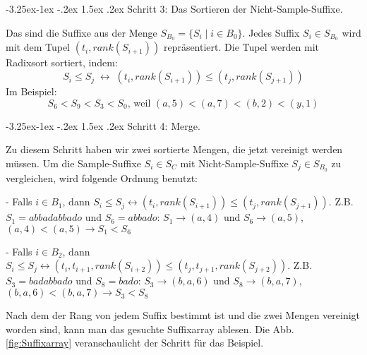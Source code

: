 \documentclass[12pt]{report}
\makeatletter
\renewcommand\paragraph{\@startsection{paragraph}{4}{\z@}%
    {-3.25ex\@plus -1ex \@minus -.2ex}%
    {1.5ex \@plus .2ex}%
    {\normalfont\normalsize\bfseries}}
\makeatother
\begin{document}
\paragraph{Schritt 3: Das Sortieren der Nicht-Sample-Suffixe.}

Das sind die Suffixe aus der Menge $S_{B_0} = \{S_i \mid i \in B_0\}$. Jedes Suffix $S_i \in S_{B_0}$ wird mit dem Tupel $(t_i,rank(S_{i+1}))$ repräsentiert. Die Tupel werden mit Radixsort sortiert, indem:
$$
S_i \le S_j \; \leftrightarrow \; (t_i,rank(S_{i+1})) \le (t_j,rank(S_{j+1}))
$$
Im Beispiel:
$$
S_6 < S_9 < S_3 < S_0 \mbox{, weil }(a,5) < (a,7) < (b,2) < (y,1)
$$

\paragraph{Schritt 4: Merge.}

Zu diesem Schritt haben wir zwei sortierte Mengen, die jetzt vereinigt werden müssen. Um die Sample-Suffixe $S_i \in S_C$ mit Nicht-Sample-Suffixe $S_j \in S_{B_0}$ zu vergleichen, wird folgende Ordnung benutzt:

    - Falls $i \in B_1$, dann $S_i \le S_j \leftrightarrow (t_i,rank(S_{i+1})) \le (t_j,rank(S_{j+1}))$. Z.B. $S_1 = abbadabbado$ und $S_6 = abbado$: $S_1 \rightarrow (a,4)$ und $S_6 \rightarrow (a,5)$, $(a,4) < (a,5) \rightarrow S_1 < S_6$

    - Falls $i \in B_2$, dann $S_i \le S_j \leftrightarrow (t_i,t_{i+1},rank(S_{i+2})) \le (t_j,t_{j+1},rank(S_{j+2}))$. Z.B. $S_3 = badabbado$ und $S_8 = bado$: $S_3 \rightarrow (b,a,6)$ und $S_8 \rightarrow (b,a,7)$, $(b,a,6) < (b,a,7) \rightarrow S_3 < S_8$

Nach dem der Rang von jedem Suffix bestimmt ist und die zwei Mengen vereinigt worden sind, kann man das gesuchte Suffixarray ablesen. Die Abb. \ref{fig:Suffixarray} veranschaulicht der Schritt für das Beispiel.
\end{document}
